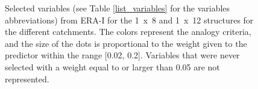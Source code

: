 \documentclass[draft]{agujournal2019}
\begin{document}
\begin{figure}[H]
	\vspace{-1cm}
	\noindent{}
	\vspace{-0.8cm}
	\caption{Selected variables (see Table \ref{list_variables} for the variables abbreviations) from ERA-I for the 1~x~8 and 1~x~12 structures for the different catchments. The colors represent the analogy criteria, and the size of the dots is proportional to the weight given to the predictor within the range [0.02, 0.2]. Variables that were never selected with a weight equal to or larger than 0.05 are not represented.}
	\label{fig_multiple_variables_erai}
\end{figure}
\end{document}
